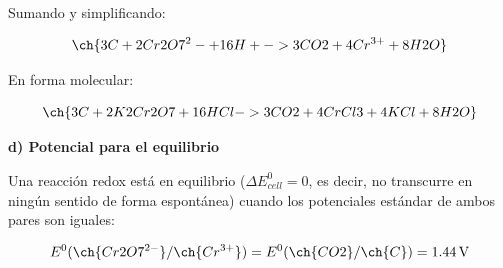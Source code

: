 \begin{exerciseEVAU}
\begin{solu}
    Sumando y simplificando:

    \begin{equation*}
        \ch{3 C + 2 Cr2O7^2- + 16 H+ -> 3 CO2 + 4 Cr^{3+} + 8 H2O}
    \end{equation*}

    En forma molecular:

    \begin{equation*}
        \ch{3 C + 2 K2Cr2O7 + 16 HCl -> 3 CO2 + 4 CrCl3 + 4 KCl + 8 H2O}
    \end{equation*}

    \textbf{d) Potencial para el equilibrio}

    Una reacción redox está en equilibrio (\(\Delta E^0_{cell} = 0\), es decir, no transcurre en ningún sentido de forma espontánea) cuando los potenciales estándar de ambos pares son iguales:

    \begin{equation*}
        E^0(\ch{Cr2O7^{2-}}/\ch{Cr^{3+}}) = E^0(\ch{CO2}/\ch{C}) = \SI{1.44}{\volt}
    \end{equation*}

\end{solu}
\end{exerciseEVAU}

